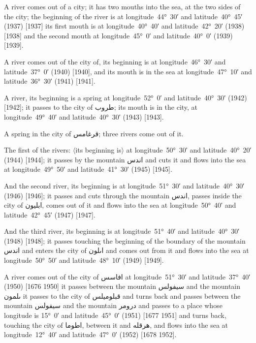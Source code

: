\documentclass[11pt]{article}
\newcommand{\Pg}[1]{\marginpar{\footnotesize #1}}
\newcommand{\Ang}[1]{\ensuremath{#1}}
\begin{document}
A river comes out of a city; it has two mouths into the sea, at the two sides of the city; the beginning of the river is at longitude~44°~30′ and latitude~40°~45′ (1937) [1937] its first mouth is at longitude~40°~40′ and latitude~42°~20′ (1938) [1938] and the second mouth at longitude~45°~0′ and latitude~40°~0′ (1939) [1939].

A river comes out of the city of, its beginning is at longitude~46°~30′ and latitude~37°~0′ (1940) [1940], and its mouth is in the sea at longitude~47°~10′ and latitude~36°~30′ (1941) [1941].

A river, its beginning is a spring at longitude~52°~0′ and latitude~40°~30′ (1942) [1942]; it passes to the city of \textarabic{طروب}; its mouth is in the city, at longitude~49°~40′ and latitude~40°~30′ (1943) [1943].

A spring in the city of \textarabic{قرغامس}; three rivers come out of it.

The first of the rivers: \Ang{\langle}its beginning is\Ang{\rangle} at longitude~50°~30′ and latitude~40°~20′ (1944) [1944]; it passes by the mountain \textarabic{اندس} and cuts it and flows into the sea at longitude~49°~50′ and latitude~41°~30′ (1945) [1945].

And the second river, its beginning is at longitude~51°~30′ and latitude~40°~30′ (1946) [1946]; it passes and cuts through the mountain \textarabic{اندس}, passes inside the city of \textarabic{ابليون}, comes out of it and flows into the sea at longitude~50°~40′ and latitude~42°~45′ (1947) [1947].

And the third river, its beginning is at longitude~51°~40′ and latitude~40°~30′ (1948) [1948]; it passes touching the beginning of the boundary of the mountain \textarabic{اندس} and enters the city of \textarabic{اٮلون} and comes out from it and flows into the sea at longitude~50°~50′ and latitude~48°~10′ (1949) [1949].

A river comes out of the city of \textarabic{افاسس} at longitude~51°~30′ and latitude~37°~40′ (1950) [1676 1950]\Pg{p. 129} it passes between the mountain \textarabic{سيفولس} and the mountain \textarabic{ٮلمون} it passes to the city of \textarabic{قبلوميلس} and turns back and passes between the mountain \textarabic{سيفولس} and the mountain \textarabic{درومر} and passes to a place whose longitude is 15°~0′ and latitude~45°~0′ (1951) [1677 1951] and turns back, touching the city of \textarabic{اطوما}, between it and \textarabic{هرقله}, and flows into the sea at longitude~12°~40′ and latitude~47°~0′ (1952) [1678 1952].
\end{document}
